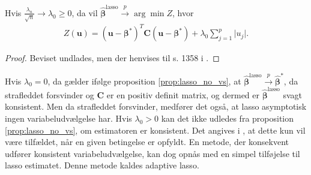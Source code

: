 \begin{prop}\label{prop:lasso_no_vs}
Hvis $\frac{\lambda_n}{\sqrt{n}} \rightarrow \lambda_0 \geq 0$, da vil $\hat{\boldsymbol{\beta}}^\text{lasso} \overset{p}{\rightarrow} \arg \min Z$, hvor
\begin{align*}
Z(\mathbf{u})=(\mathbf{u}- \boldsymbol{\beta}^*)^T \mathbf{C} (\mathbf{u}-\boldsymbol{\beta}^*)+\lambda_0 \sum_{j=1}^p \vert u_j \vert.
\end{align*}
\end{prop}
\begin{proof}
Beviset undlades, men der henvises til s. 1358 i \citep{adaptive_lasso_knight}.
\end{proof}
Hvis $\lambda_0=0$, da gælder ifølge proposition \ref{prop:lasso_no_vs}, at $\hat{\boldsymbol{\beta}}^\text{lasso} \overset{p}{\rightarrow} \hat{\boldsymbol{\beta}}^{*}$, da strafleddet forsvinder og $\mathbf{C}$ er en positiv definit matrix, og dermed er $\hat{\boldsymbol{\beta}}^\text{lasso}$ svagt konsistent. Men da strafleddet forsvinder, medfører det også, at lasso asymptotisk ingen variabeludvælgelse har. Hvis $\lambda_0>0$ kan det ikke udledes fra proposition \ref{prop:lasso_no_vs}, om estimatoren er konsistent. Det angives i \citep{adaptive_lasso}, at dette kun vil være tilfældet, når en given betingelse er opfyldt. En metode, der konsekvent udfører konsistent variabeludvælgelse, kan dog opnås med en simpel tilføjelse til lasso estimatet. Denne metode kaldes adaptive lasso.

